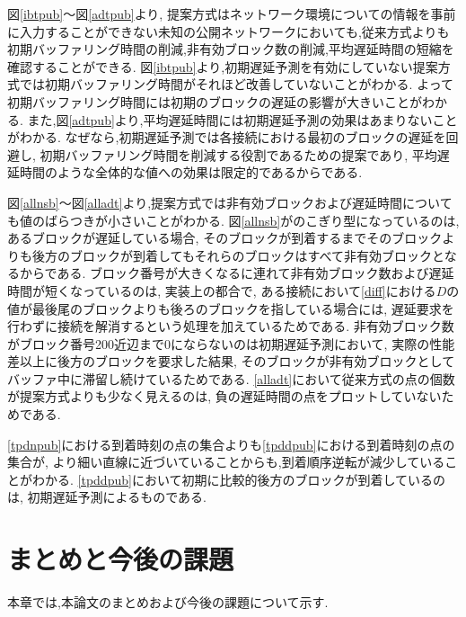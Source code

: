 \documentclass[a4j,12pt]{gradthesis_utf8}
\begin{document}
\clearpage

図\ref{ibtpub}〜図\ref{adtpub}より,
提案方式はネットワーク環境についての情報を事前に入力することができない未知の公開ネットワークにおいても,従来方式よりも初期バッファリング時間の削減,非有効ブロック数の削減,平均遅延時間の短縮を確認することができる.
図\ref{ibtpub}より,初期遅延予測を有効にしていない提案方式では初期バッファリング時間がそれほど改善していないことがわかる.
よって初期バッファリング時間には初期のブロックの遅延の影響が大きいことがわかる.
また,図\ref{adtpub}より,平均遅延時間には初期遅延予測の効果はあまりないことがわかる.
なぜなら,初期遅延予測では各接続における最初のブロックの遅延を回避し,
初期バッファリング時間を削減する役割であるための提案であり,
平均遅延時間のような全体的な値への効果は限定的であるからである.

図\ref{allnsb}〜図\ref{alladt}より,提案方式では非有効ブロックおよび遅延時間についても値のばらつきが小さいことがわかる.
図\ref{allnsb}がのこぎり型になっているのは,あるブロックが遅延している場合,
そのブロックが到着するまでそのブロックよりも後方のブロックが到着してもそれらのブロックはすべて非有効ブロックとなるからである.
ブロック番号が大きくなるに連れて非有効ブロック数および遅延時間が短くなっているのは,
実装上の都合で,
ある接続において\ref{diff}における\begin{math}D\end{math}の値が最後尾のブロックよりも後ろのブロックを指している場合には,
遅延要求を行わずに接続を解消するという処理を加えているためである.
非有効ブロック数がブロック番号200近辺まで0にならないのは初期遅延予測において,
実際の性能差以上に後方のブロックを要求した結果,
そのブロックが非有効ブロックとしてバッファ中に滞留し続けているためである.
\ref{alladt}において従来方式の点の個数が提案方式よりも少なく見えるのは,
負の遅延時間の点をプロットしていないためである.

\ref{tpdnpub}における到着時刻の点の集合よりも\ref{tpddpub}における到着時刻の点の集合が,
より細い直線に近づいていることからも,到着順序逆転が減少していることがわかる.
\ref{tpddpub}において初期に比較的後方のブロックが到着しているのは,
初期遅延予測によるものである.
 
\chapter{まとめと今後の課題}\label{matomekongo}
本章では,本論文のまとめおよび今後の課題について示す.
\end{document}
